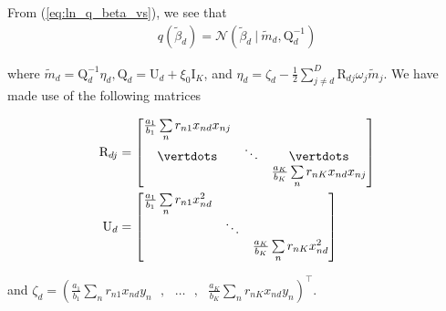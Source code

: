 \documentclass[twoside,11pt]{article}
\newcommand\given[1][]{\:#1\vert\:}
\newcommand{\transpose}[1]{#1^{\intercal}}
\newcommand{\nsum}{\sum\limits_{n}}
\newcommand{\betad}{\tilde{\beta}_d}
\newcommand{\umat}{\mathrm{U}}
\newcommand{\qmat}{\mathrm{Q}}
\begin{document}
From (\ref{eq:ln_q_beta_vs}), we see that
\begin{align*}
	q(\betad) = \mathcal{N} \left( \betad \given \tilde{m}_d, \qmat_d^{-1} \right)
\end{align*}

where $\tilde{m}_d = \qmat_d^{-1} \eta_d, \qmat_d = \umat_d + \xi_0 \mathrm{I}_K$, and $\eta_d = \zeta_d - \frac{1}{2} \sum\limits_{j \neq d}^D \mathrm{R}_{dj} \omega_j \tilde{m}_j$. We have made use of the following matrices

\begin{align*}
\mathrm{R}_{dj} &= \begin{bmatrix} 
\frac{a_1}{b_1} \nsum r_{n1} x_{nd}x_{nj}           &          &          \\ 
\vertdots   &  \ddots    & \vertdots \\
            &          & \frac{a_K}{b_K} \nsum r_{nK} x_{nd}x_{nj}        \\
\end{bmatrix} \\
\umat_d & = \begin{bmatrix} 
\frac{a_1}{b_1} \nsum r_{n1} x_{nd}^2            &               &  \\ 
            &  \ddots       &  \\
            &               & \frac{a_K}{b_K} \nsum r_{nK} x_{nd}^2 \\
\end{bmatrix}
\end{align*}

and $\zeta_d = \transpose{\left( \frac{a_1}{b_1} \sum_n r_{n1} x_{nd}y_{n} \textrm{ } , \textrm{ }\ldots \textrm{ } , \textrm{ } \frac{a_K}{b_K} \sum_n r_{nK} x_{nd}y_{n} \right)}$.
\end{document}
